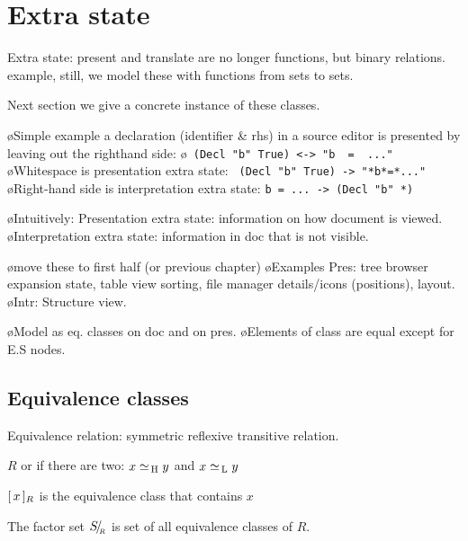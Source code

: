 %																
%																
%																
\section{Extra state} \label{sect:singleExtra}


Extra state: present and translate are no longer functions, but binary relations. example, still, we model these with functions from sets to sets.

Next section we give a concrete instance of these classes.

\bl
\o Simple example a declaration (identifier \& rhs) in a source editor is presented by leaving out the righthand side:
\o  \verb| (Decl "b" True) <-> "b  =  ..."|
\o Whitespace is presentation extra state: \verb| (Decl "b" True) -> "*b*=*..."|
\o Right-hand side is interpretation extra state: \verb|b = ... -> (Decl "b" *)|
\el

\bl
\o Intuitively: Presentation extra state: information on how document is viewed. 
\o Interpretation extra state: information in doc that is not visible. 
\el

\bl
\o move these to first half (or previous chapter)
\o Examples Pres: tree browser expansion state, table view sorting, file manager details/icons (positions), layout.
\o Intr: Structure view.
\el

\bl
\o Model as eq. classes on doc and on pres.
\o Elements of class are equal except for E.S nodes.
\el


\subsection{Equivalence classes}

Equivalence relation: symmetric reflexive
transitive relation.

$R$ or if there are two:  $x \simeq_{\, \mathrm H} y$  and $x \simeq_{\, \mathrm L} y$ 


$[\,{x}\,]_{{R}}$ is the equivalence class that contains $x$



The factor set ${S}\!/_{{_{\!\!{R}}}}$ is set of all equivalence classes of $R$.

